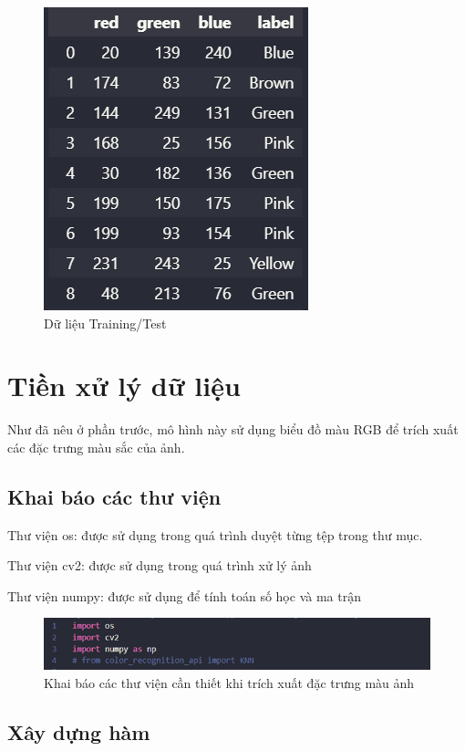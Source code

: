 \documentclass[../BTL.tex]{subfiles}
\begin{document}
\begin{figure}[H]
    \centering
    \includegraphics[scale=0.8]{BTL BaoCao Latex TTNT/Anh/data.png}
    \caption{Dữ liệu Training/Test}
    \label{fig:data}
\end{figure}

\section{Tiền xử lý dữ liệu}
Như đã nêu ở phần trước, mô hình này sử dụng biểu đồ màu RGB để trích xuất các đặc trưng màu sắc của ảnh. 
\subsection{Khai báo các thư viện}
Thư viện os: được sử dụng trong quá trình duyệt từng tệp trong thư mục.

Thư viện cv2: được sử dụng trong quá trình xử lý ảnh

Thư viện numpy: được sử dụng để tính toán số học và ma trận

\begin{figure}[H]
    \centering
    \includegraphics[scale=0.6]{BTL BaoCao Latex TTNT/Anh/thư viện để trích xuất đặc trưng.png}
    \caption{Khai báo các thư viện cần thiết khi trích xuất đặc trưng màu ảnh}
    \captionsetup{justification=centering}
    \label{fig:color_feagure}
\end{figure}

\subsection{Xây dựng hàm}
\end{document}
